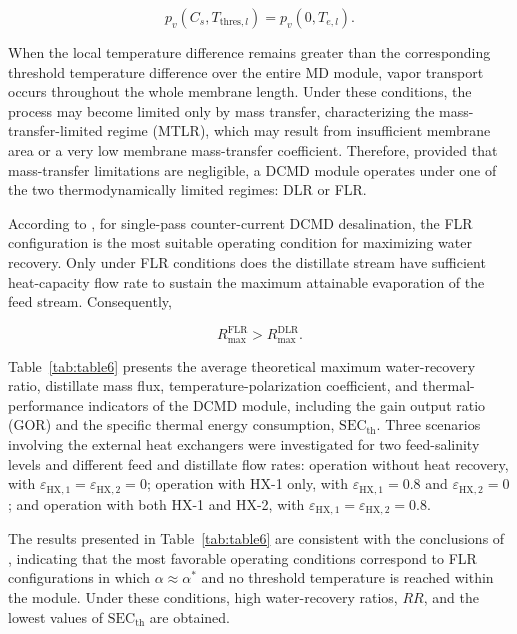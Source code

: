 \documentclass[14pt,letterpaper,fleqn]{extarticle}
\begin{document}
\begin{equation}
p_v\left(C_s,T_{\mathrm{thres},l}\right)
=
p_v\left(0,T_{e,l}\right).
\label{eq:threshold_temperature_FLR}
\end{equation}

When the local temperature difference remains greater than the corresponding threshold 
temperature difference over the entire MD module, vapor transport occurs throughout the
whole membrane length. Under these conditions, the process may become limited only by 
mass transfer, characterizing the mass-transfer-limited regime (MTLR), which may result
from insufficient membrane area or a very low membrane mass-transfer coefficient. 
Therefore, provided that mass-transfer limitations are negligible, a DCMD module 
operates under one of the two thermodynamically limited regimes: DLR or FLR.

According to \citet{Christie2020}, for single-pass counter-current DCMD desalination,
the FLR configuration is the most suitable operating condition for maximizing water
recovery. Only under FLR conditions does the distillate stream have sufficient heat-capacity
flow rate to sustain the maximum attainable evaporation of the feed stream. Consequently,

\begin{equation}
R_{\max}^{\mathrm{FLR}}
>
R_{\max}^{\mathrm{DLR}}.
\label{eq:Rmax_FLR_greater_DLR}
\end{equation}

Table~\ref{tab:table6} presents the average theoretical maximum water-recovery ratio, 
distillate mass flux, temperature-polarization coefficient, and thermal-performance 
indicators of the DCMD module, including the gain output ratio (GOR) and the specific 
thermal energy consumption, $\mathrm{SEC}_{\mathrm{th}}$. Three scenarios involving the
external heat exchangers were investigated for two feed-salinity levels and different
feed and distillate flow rates: operation without heat recovery, with $\varepsilon_{\mathrm{HX},1} = \varepsilon_{\mathrm{HX},2} = 0$; 
operation with HX-1 only, with $\varepsilon_{\mathrm{HX},1} = 0.8$ and $\varepsilon_{\mathrm{HX},2} = 0$;
and operation with both HX-1 and HX-2, with $\varepsilon_{\mathrm{HX},1} = \varepsilon_{\mathrm{HX},2} = 0.8$.

The results presented in Table~\ref{tab:table6} are consistent with the conclusions of \citet{Christie2020}, 
indicating that the most favorable operating conditions correspond to FLR configurations in which $\alpha \approx \alpha^{*}$ 
and no threshold temperature is reached within the module. Under these conditions, high water-recovery ratios, $RR$, and the 
lowest values of $\mathrm{SEC}_{\mathrm{th}}$ are obtained.
\end{document}
